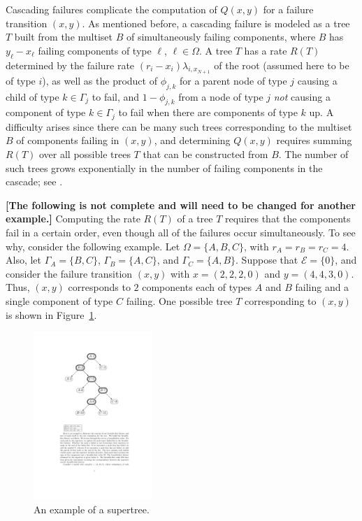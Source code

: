 \documentclass[12pt]{article}
\begin{document}
Cascading failures complicate the
computation of $Q(x,y)$
for a failure transition $(x,y)$.
As mentioned before, a cascading
failure is modeled as a tree $T$
built from the multiset $B$ of 
simultaneously failing
components,
where $B$ has
$y_\ell - x_\ell$ failing components
of type $\ell$, $\ell \in \Omega$.
A tree $T$ has a rate $R(T)$ determined
by the failure rate
$(r_i - x_i) \lambda_{i,x_{N+1}}$
of the root (assumed here to be of type $i$),
as well as the product of $\phi_{j,k}$
for a parent node of type $j$ causing
a child of type $k \in \Gamma_j$ to fail,
and $1 - \phi_{j,k}$ from
a node of type $j$
\textit{not} causing
a component of type $k \in \Gamma_j$
to fail when there are
components of type $k$ up.
A difficulty arises since
there can be many such trees
corresponding to the multiset $B$
of components failing in $(x,y)$,
and determining $Q(x,y)$ requires
summing $R(T)$ over all possible
trees $T$ that can be constructed
from $B$.
The number of such trees
grows exponentially in the
number of failing components in the
cascade; see \cite{ING:2009}.


\textbf{[The following is not complete
and will need to be changed
for another example.]}
Computing the rate $R(T)$ of a tree $T$
requires that the components fail
in a certain order, even though all
of the failures occur simultaneously.
To see why, consider the following example.
Let $\Omega = \{ A, B, C \}$,
with $r_A = r_B = r_C = 4$.
Also, let
$\Gamma_A = \{ B, C \}$,
$\Gamma_B = \{ A, C \}$,
and
$\Gamma_C = \{ A, B \}$.
Suppose that $\mathcal{E} = \{ 0 \}$,
and consider the failure transition
$(x,y)$ with
$x = (2, 2, 2, 0)$
and
$y = (4, 4, 3, 0)$.
Thus, $(x,y)$ corresponds
to $2$ components each of
types $A$ and $B$ failing
and a single component of type
$C$ failing.
One possible tree $T$
corresponding to $(x,y)$
is shown in Figure~\ref{fig:tree}.

\begin{figure}
\begin{center}
\includegraphics[width=0.4\textwidth]{fig_tree}
\end{center}
\caption{An example of a supertree.}
\label{fig:tree}
\end{figure}
\end{document}
